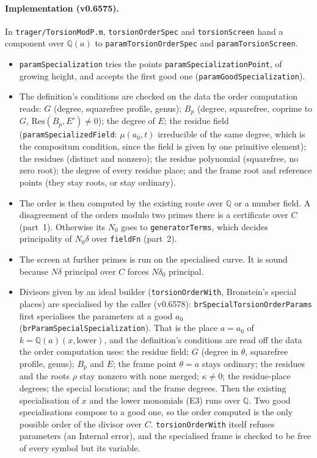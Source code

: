 \documentclass[11pt]{article}
\theoremstyle{definition}
\theoremstyle{remark}
\newcommand{\Q}{\mathbb{Q}}
\newcommand{\code}[1]{\texttt{#1}}
\begin{document}
\paragraph{Implementation (v0.6575).} In \code{trager/TorsionModP.m},
\code{torsionOrderSpec} and \code{torsionScreen} hand a component over $\Q(a)$ to
\code{paramTorsionOrderSpec} and \code{paramTorsionScreen}.
\begin{itemize}
\item \code{paramSpecialization} tries the points \code{paramSpecializationPoint}, of
  growing height, and accepts the first good one (\code{paramGoodSpecialization}).
\item The definition's conditions are checked on the data the order computation
  reads: $G$ (degree, squarefree profile, genus); $B_p$ (degree, squarefree, coprime
  to $G$, $\mathrm{Res}(B_p,E')\ne0$); the degree of $E$; the residue field
  (\code{paramSpecializedField}: $\mu(a_0,t)$ irreducible of the same degree, which is
  the compositum condition, since the field is given by one primitive element); the
  residues (distinct and nonzero); the residue polynomial (squarefree, no zero root);
  the degree of every residue place; and the frame root and reference points (they
  stay roots, or stay ordinary).
\item The order is then computed by the existing route over $\Q$ or a number field.
  A disagreement of the orders modulo two primes there is a certificate over $C$
  (part~1). Otherwise its $N_0$ goes to \code{generatorTerms}, which decides
  principality of $N_0\delta$ over \code{fieldFn} (part~2).
\item The screen at further primes is run on the specialised curve. It is sound
  because $N\delta$ principal over $C$ forces $N\delta_0$ principal.
\item Divisors given by an ideal builder (\code{torsionOrderWith}, Bronstein's special
  places) are specialised by the caller (v0.6578): \code{brSpecialTorsionOrderParams}
  first specialises the parameters at a good $a_0$
  (\code{brParamSpecialSpecialization}). That is the place $a=a_0$ of
  $k=\Q(a)(x,\text{lower})$, and the definition's conditions are read off the data
  the order computation uses: the residue field; $G$ (degree in $\theta$, squarefree
  profile, genus); $B_p$ and $E$; the frame point $\theta=a$ stays ordinary; the
  residues and the roots $\rho$ stay nonzero with none merged; $\kappa\ne0$; the
  residue-place degrees; the special locations; and the frame degrees. Then the
  existing specialisation of $x$ and the lower monomials (E3) runs over $\Q$. Two
  good specialisations compose to a good one, so the order computed is the only
  possible order of the divisor over $C$. \code{torsionOrderWith} itself refuses
  parameters (an Internal error), and the specialised frame is checked to be free of
  every symbol but its variable.
\end{itemize}
\end{document}
